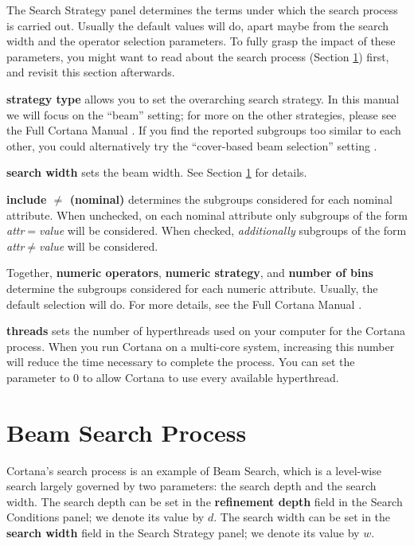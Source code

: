 \documentclass{article}
\begin{document}
The Search Strategy panel determines the terms under which the search
process is carried out.  Usually the default values will do, apart maybe
from the search width and the operator selection parameters. To fully grasp
the impact of these parameters, you might want to read about the search
process (Section \ref{sec:searchprocess}) first, and revisit this section
afterwards.

\textbf{strategy type} allows you to set the overarching search strategy. 
In this manual we will focus on the ``beam'' setting; for more on the other
strategies, please see the Full Cortana Manual \cite{full}.  If you find the
reported subgroups too similar to each other, you could alternatively try
the ``cover-based beam selection'' setting \cite{2011Leeuwen}.

\textbf{search width} sets the beam width. See Section
\ref{sec:searchprocess} for details.

\textbf{include $\neq$ (nominal)} determines the subgroups considered for
each nominal attribute.  When unchecked, on each nominal attribute only
subgroups of the form \emph{attr}$=$\emph{value} will be considered.  When
checked, \emph{additionally} subgroups of the form
\emph{attr}$\neq$\emph{value} will be considered.

Together, \textbf{numeric operators}, \textbf{numeric strategy}, and
\textbf{number of bins} determine the subgroups considered for each numeric
attribute.  Usually, the default selection will do.  For more details, see
the Full Cortana Manual \cite{full}.

\textbf{threads} sets the number of hyperthreads used on your computer for
the Cortana process.  When you run Cortana on a multi-core system,
increasing this number will reduce the time necessary to complete the
process.  You can set the parameter to $0$ to allow Cortana to use every
available hyperthread.

\section{Beam Search Process}
\label{sec:searchprocess}

Cortana's search process is an example of Beam Search, which is a level-wise
search largely governed by two parameters: the \gls{search depth} and the
\gls{search width}.  The search depth can be set in the \textbf{refinement
depth} field in the Search Conditions panel; we denote its value by $d$. 
The search width can be set in the \textbf{search width} field in the Search
Strategy panel; we denote its value by $w$.
\end{document}
